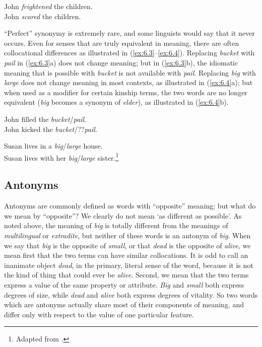 \ea \label{ex:6.2}
\ea John \textit{frightened} the children.\\
\ex John \textit{scared} the children.
                       \z
\z


“Perfect” synonymy is extremely rare, and some linguists would say that it never occurs. Even for senses that are truly equivalent in meaning, there are often collocational differences as illustrated in (\ref{ex:6.3}--\ref{ex:6.4}). Replacing \textit{bucket} with \textit{pail} in (\ref{ex:6.3}a) does not change meaning; but in (\ref{ex:6.3}b), the idiomatic meaning that is possible with \textit{bucket} is not available with \textit{pail}. Replacing \textit{big} with \textit{large} does not change meaning in most contexts, as illustrated in (\ref{ex:6.4}a); but when used as a modifier for certain kinship terms, the two words are no longer equivalent (\textit{big} becomes a synonym of \textit{elder}), as illustrated in (\ref{ex:6.4}b).


\ea \label{ex:6.3}
\ea John filled the \textit{bucket}/\textit{pail}.\\
\ex John kicked the \textit{bucket}/??\textit{pail}.
                       \z
\z

\ea \label{ex:6.4}
\ea Susan lives in a \textit{big}/\textit{large} house.\\
\ex Susan lives with her \textit{big}/\textit{large} sister.\footnote{Adapted from \citet[66]{Saeed2009}.}
                       \z
\z

\subsection{Antonyms}\label{sec:} %

Antonyms are commonly defined as words with “opposite” meaning; but what do we mean by “opposite”? We clearly do not mean ‘as different as possible’. As noted above, the meaning of \textit{big} is totally different from the meanings of \textit{multilingual} or \textit{extradite}, but neither of these words is an antonym of \textit{big}. When we say that \textit{big} is the opposite of \textit{small}, or that \textit{dead} is the opposite of \textit{alive}, we mean first that the two terms can have similar collocations. It is odd to call an inanimate object \textit{dead}, in the primary, literal sense of the word, because it is not the kind of thing that could ever be \textit{alive}. Second, we mean that the two terms express a value of the same property or attribute. \textit{Big} and \textit{small} both express degrees of size, while \textit{dead} and \textit{alive} both express degrees of vitality. So two words which are antonyms actually share most of their components of meaning, and differ only with respect to the value of one particular feature.



